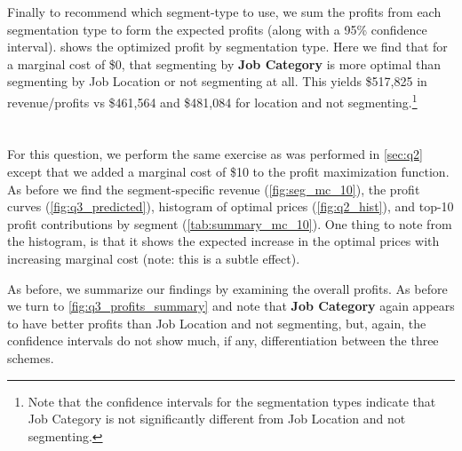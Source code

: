 Finally to recommend which segment-type to use, we sum the profits from each segmentation type to form the expected profits (along with a 95\% confidence interval).   shows the optimized profit by segmentation type.  Here we find that for a marginal cost of \$0, that segmenting by \textbf{Job Category} is more optimal than segmenting by Job Location or not segmenting at all.  This yields \$517,825 in revenue/profits vs \$461,564 and \$481,084 for location and not segmenting.\footnote{Note that the confidence intervals for the segmentation types indicate that Job Category is not significantly different from Job Location and not segmenting.}




\section{} %
For this question, we perform the same exercise as was performed in \cref{sec:q2} except that we added a marginal cost of \$10 to the profit maximization function.  As before we find the segment-specific revenue (\vref{fig:seg_mc_10}), the profit curves (\vref{fig:q3_predicted}), histogram of optimal prices (\vref{fig:q2_hist}), and top-10 profit contributions by segment (\vref{tab:summary_mc_10}).  One thing to note from the histogram, is that it shows the expected increase in the optimal prices with increasing marginal cost (note: this is a subtle effect).

As before, we summarize our findings by examining the overall profits.  As before we turn to \vref{fig:q3_profits_summary} and note that \textbf{Job Category} again appears to have better profits than Job Location and not segmenting, but, again, the confidence intervals do not show much, if any, differentiation between the three schemes.





% 


